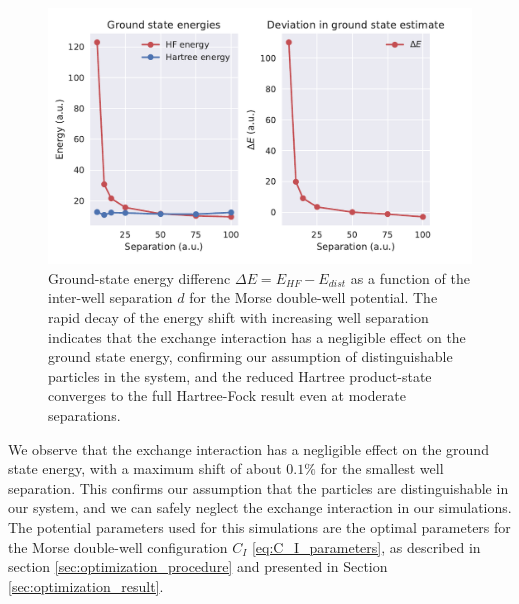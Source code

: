 \documentclass{subfiles}
\begin{document}
\begin{figure}[h!]
    \centering
    \includegraphics[width=1.0\textwidth]{figs/exchange_shift.pdf}
    \caption{Ground-state energy differenc $\Delta E = E_{HF} - E_{dist}$ as a function of the inter-well separation $d$ for the Morse double-well potential. The rapid decay of the energy shift with increasing well separation indicates that the exchange interaction has a negligible effect on the ground state energy, confirming our assumption of distinguishable particles in the system, and the reduced Hartree product-state converges to the full Hartree-Fock result even at moderate separations.}
    \label{fig:exchange_shift}
\end{figure}
We observe that the exchange interaction has a negligible effect on the ground state energy, with a maximum shift of about $0.1\%$ for the smallest well separation. This confirms our assumption that the particles are distinguishable in our system, and we can safely neglect the exchange interaction in our simulations. The potential parameters used for this simulations are the optimal parameters for the Morse double-well configuration $C_I$ \eqref{eq:C_I_parameters}, as described in section \ref{sec:optimization_procedure} and presented in Section \ref{sec:optimization_result}.
\end{document}
